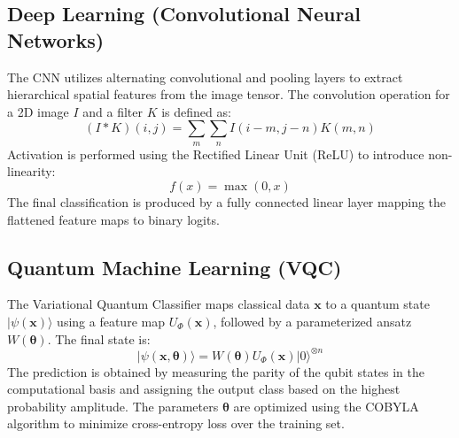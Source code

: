 \documentclass[conference]{IEEEtran}
\begin{document}
\subsection{Deep Learning (Convolutional Neural Networks)}
The CNN utilizes alternating convolutional and pooling layers to extract hierarchical spatial features from the image tensor. The convolution operation for a 2D image $I$ and a filter $K$ is defined as:
\begin{equation}
(I * K)(i, j) = \sum_{m} \sum_{n} I(i-m, j-n) K(m, n)
\end{equation}
Activation is performed using the Rectified Linear Unit (ReLU) to introduce non-linearity:
\begin{equation}
f(x) = \max(0, x)
\end{equation}
The final classification is produced by a fully connected linear layer mapping the flattened feature maps to binary logits.

\subsection{Quantum Machine Learning (VQC)}
The Variational Quantum Classifier maps classical data $\mathbf{x}$ to a quantum state $|\psi(\mathbf{x})\rangle$ using a feature map $U_{\Phi}(\mathbf{x})$, followed by a parameterized ansatz $W(\boldsymbol{\theta})$. The final state is:
\begin{equation}
|\psi(\mathbf{x}, \boldsymbol{\theta})\rangle = W(\boldsymbol{\theta}) U_{\Phi}(\mathbf{x}) |0\rangle^{\otimes n}
\end{equation}
The prediction is obtained by measuring the parity of the qubit states in the computational basis and assigning the output class based on the highest probability amplitude. The parameters $\boldsymbol{\theta}$ are optimized using the COBYLA algorithm to minimize cross-entropy loss over the training set.
\end{document}
